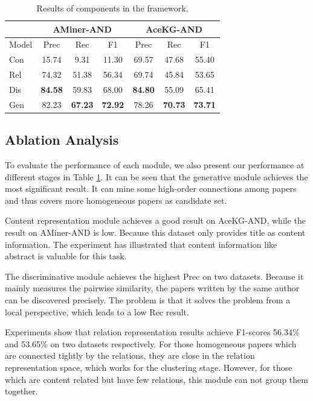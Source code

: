 \documentclass[letterpaper]{article}
\begin{document}
\begin{table}[t]
\caption{Results of components in the framework.}
\label{tb:contribution}
\begin{center}
\small
\begin{tabular}{l|ccc|ccc}
\toprule[0.1em]
& \multicolumn{3}{c|}{AMiner-AND} & \multicolumn{3}{c}{AceKG-AND}\\
\hline
Model & Prec & Rec & F1& Prec & Rec & F1 \\
\hline
Con & 15.74 & 9.31 & 11.30 & 69.57 & 47.68 & 55.40 \\
Rel & 74.32	& 51.38	& 56.34 & 69.74 & 45.84 & 53.65\\
Dis & \textbf{84.58} & 59.83 & 68.00 & \textbf{84.80} & 55.09 & 65.41\\
Gen & 82.23 & \textbf{67.23} & \textbf{72.92} & 78.26 & \textbf{70.73} & \textbf{73.71}\\
\bottomrule[0.1em]
\end{tabular}
\end{center}
\end{table}

\subsection{Ablation Analysis}
To evaluate the performance of each module, we also present our performance at different stages in Table \ref{tb:contribution}.
It can be seen that the generative module achieves the most significant result.
It can mine some high-order connections among papers and thus covers more homogeneous papers as candidate set.

Content representation module achieves a good result on AceKG-AND,
while the result on AMiner-AND is low. Because this dataset only provides title as content information.
The experiment has illustrated that content information like abstract is valuable for this task.

The discriminative module achieves the highest Prec on two datasets. Because it mainly measures the pairwise similarity, the papers written by the same author
 can be discovered precisely.
The problem is that it solves the problem from a local perspective, which leads to a low Rec result.

Experiments show that relation representation results achieve F1-scores 56.34\% and 53.65\% on two datasets respectively.
For those homogeneous papers which are connected tightly by the relations, they are close in the relation representation space, which works for the clustering stage. However, for those which are content related but have few relations, this module can not group them together.
\end{document}
